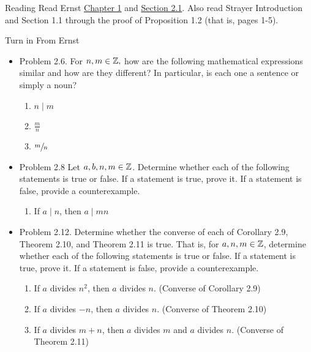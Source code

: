 \documentclass{ximera}
\begin{document}
  
\begin{pre}
\item[Reading]  Read Ernst  \href{https://danaernst.com/IBL-IntroToProof/pretext/chap_intro.html}{Chapter 1} and \href{https://danaernst.com/IBL-IntroToProof/pretext/sec_baby_number_theory.html}{Section 2.1}. Also read Strayer Introduction and Section 1.1 through the proof of Proposition 1.2 (that is, pages 1-5).

\item[Turn in] From Ernst
\begin{itemize}
 \item Problem 2.6. For $n,m\in\mathbb Z,$ how are the following mathematical expressions similar and how are they different? In particular, is each one a sentence or simply a noun?
 
\begin{enumerate}%
\item  $n\mid m$
\item $\frac{m}{n}$ 
\item $\sfrac{m}{n}$ 
\end{enumerate}


\item Problem 2.8 Let $a,b,n,m\in\mathbb Z$.
 Determine whether each of the following statements is true or false. If a statement is true, prove it. If a statement is false, provide a counterexample.
 \begin{enumerate}%
\item  If $a\mid n$, then $a\mid mn$

\end{enumerate}

 \item Problem 2.12. Determine whether the converse of each of Corollary 2.9, Theorem 2.10, and Theorem 2.11 is true. That is, for $a,n,m\in\mathbb Z$, determine whether each of the following statements is true or false. If a statement is true, prove it. If a statement is false, provide a counterexample.
  \begin{enumerate}%
\item  If $a$ divides $n^2$, then $a$ divides $n$. (Converse of Corollary 2.9)

\item If $a$ divides $-n$, then $a$ divides $n$. (Converse of Theorem 2.10)

\item If $a$ divides $m+n$, then $a$ divides $m$ and $a$ divides $n$.
 (Converse of Theorem 2.11)
 
\end{enumerate}
\end{itemize}
\end{pre}
\end{document}
